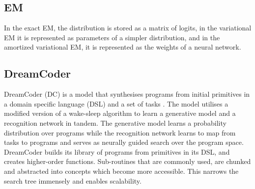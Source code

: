 







\subsection{EM}
In the exact EM, the distribution is stored as a matrix of logits, in the variational EM it is represented as parameters of a simpler distribution, and in the amortized variational EM, it is represented as the weights of a neural network.

\subsection{DreamCoder}
DreamCoder (DC) is a model that synthesises programs from initial primitives in a domain specific language (DSL) and a set of tasks \cite{ellis_dreamcoder_2021}. The model utilises a modified version of a wake-sleep algorithm \cite{hinton1995wake} to learn a generative model and a recognition network in tandem. The generative model learns a probability distribution over programs while the recognition network learns to map from tasks to programs and serves as neurally guided search over the program space.
DreamCoder builds its library of programs from primitives in its DSL, and creates higher-order functions.
Sub-routines that are commonly used, are chunked and abstracted into concepts which become more accessible. This narrows the search tree immensely and enables scalability.

